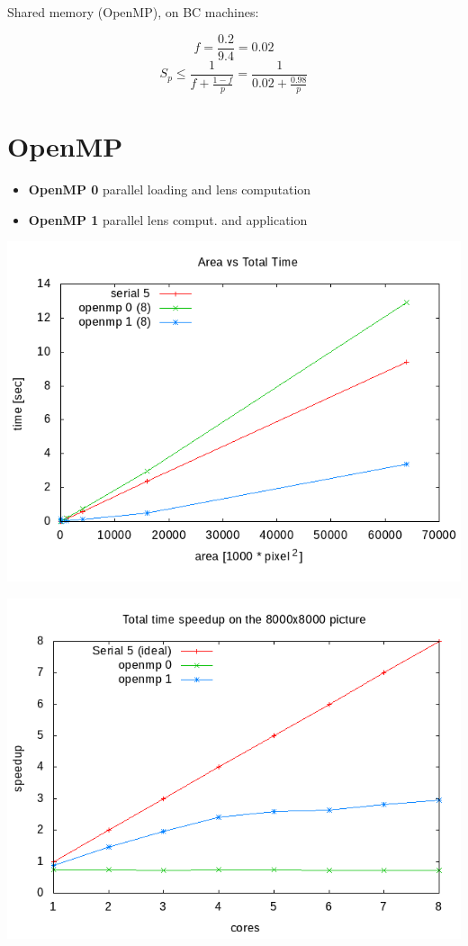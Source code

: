 \documentclass[12pt]{article}
\begin{document}
Shared memory (OpenMP), on BC machines:

$$f = \frac{0.2}{9.4} = 0.02$$
$$S_p \le \frac{1}{f + \frac{1 - f}{p}} = \frac{1}{0.02 + \frac{0.98}{p}}$$

\section{OpenMP}

\begin{itemize}
    \item \textbf{OpenMP 0} parallel loading and lens computation
    \item \textbf{OpenMP 1} parallel lens comput. and application
\end{itemize}

\begin{center}
    \begin{minipage}[b]{0.45\linewidth}
        \includegraphics[width=\textwidth]{../../plots/areatime_total_linear_omp.png}
    \end{minipage}
    \begin{minipage}[b]{0.45\linewidth}
        \includegraphics[width=\textwidth]{../../plots/omp_speedup_total_8000.png}
    \end{minipage}
\end{center}
\end{document}
